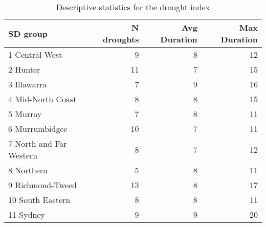 \documentclass[a4paper]{article}                %
\begin{document}

        \begin{table}[!ht]
        \begin{center}
        \caption{Descriptive statistics for the drought index}
        \label{tab:tab1}
        \begin{tabular}{lrrr}
        \hline
        SD group & N droughts & Avg Duration & Max Duration \\
        \hline
        1 Central West & 9 & 8 & 12 \\
        2 Hunter & 11 & 7 & 15 \\
        3 Illawarra & 7 & 9 & 16 \\
        4 Mid-North Coast & 8 & 8 & 15 \\
        5 Murray & 7 & 8 & 11 \\
        6 Murrumbidgee & 10 & 7 & 11 \\
        7 North and Far Western & 8 & 7 & 12 \\
        8 Northern & 5 & 8 & 11 \\
        9 Richmond-Tweed & 13 & 8 & 17 \\
        10 South Eastern & 8 & 8 & 11 \\
        11 Sydney & 9 & 9 & 20 \\
        \hline
        \end{tabular}
        \end{center}
        \end{table}


\end{document}
